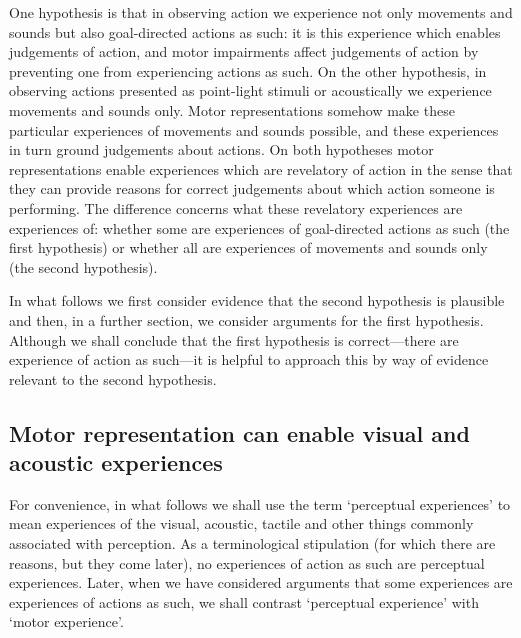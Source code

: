 \documentclass[12pt,\papersize]{extarticle}
\begin{document}
One hypothesis is that in observing action we experience not only movements and sounds but also goal-directed actions as such: it is this experience which enables judgements of action, and motor impairments affect judgements of action by preventing one from experiencing actions as such. On the other hypothesis, in observing actions presented as point-light stimuli or acoustically we experience movements and sounds only. Motor representations somehow make these particular experiences of movements and sounds possible, and these experiences in turn ground judgements about actions.  On both hypotheses motor representations enable experiences which are revelatory of action in the sense that they can provide reasons for correct judgements about which action someone is performing.  The difference concerns what these revelatory experiences are experiences of: whether some are experiences of goal-directed actions as such (the first hypothesis) or whether all are experiences of movements and sounds only (the second hypothesis).  


In what follows we first consider evidence that the second hypothesis is plausible and then, in a further section, we consider arguments for the first hypothesis.  Although we shall conclude that the first hypothesis is correct---there are experience of action as such---it is helpful to approach this by way of evidence relevant to the second hypothesis.


\subsection{Motor representation can enable visual and acoustic experiences}
For convenience, in what follows we shall use the term `perceptual experiences' to mean experiences of the visual, acoustic, tactile and other things commonly associated with perception.  As a terminological stipulation (for which there are reasons, but they come later), no experiences of action as such are perceptual experiences.  Later, when we have considered arguments that some experiences are experiences of actions as such, we shall contrast `perceptual experience' with `motor experience'.
\end{document}
